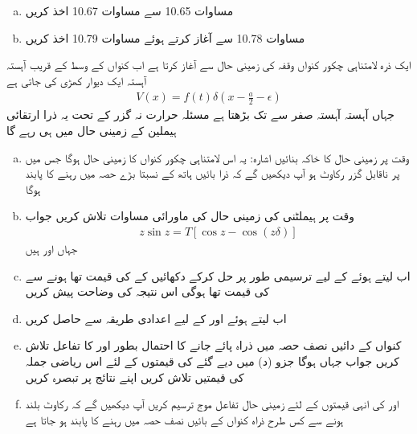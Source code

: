 \begin{enumerate}[a.]
\item
مساوات 10.65 سے مساوات 10.67 اخذ کریں 
\item
مساوات 10.78 سے آغاز کرتے ہوئے مساوات 10.79 اخذ کریں 
\end{enumerate}
ایک ذرہ لامتناہی چکور کنواں وقفہ  کی زمینی حال سے آغاز کرتا ہے اب کنواں کے وسط کے قریب آہستہ آہستہ ایک دیوار کھڑی کی جاتی ہے 
\begin{align*}
V (x) = f (t) \delta (x - \frac{a}{2} - \epsilon)
\end{align*}
جہاں  آہستہ آہستہ صفر سے  تک بڑھتا ہے مسئلہ حرارت نہ گزر کے تحت یہ ذرا ارتقائی ہیملین کے زمینی حال میں ہی رہے گا 
\begin{enumerate}[a.]
\item
وقت  پر زمینی حال کا خاکہ بنائیں اشارہ: یہ اس لامتناہی چکور کنواں کا زمینی حال ہوگا جس میں  پر ناقابل گزر رکاوٹ ہو آپ دیکھیں گے کہ ذرا بائیں ہاتھ کے نسبتا بڑے حصہ میں رہنے کا پابند ہوگا 
\item
وقت  پر ہیملٹنی کی زمینی حال کی ماورائی مساوات تلاش کریں جواب 
\begin{align*}
z \sin z = T [\cos z - \cos (z \delta)]
\end{align*}
جہاں    اور  ہیں 
\item
اب  لیتے ہوئے  کے لیے ترسیمی طور پر حل کرکے دکھائیں کے  کی قیمت  تھا  ہونے سے  کی قیمت  تھا  ہوگی اس نتیجہ کی وضاحت پیش کریں 
\item 
اب  لیتے ہوئے  اور  کے لیے  اعدادی طریقہ سے حاصل کریں 
\item
کنواں کے دائیں نصف حصہ میں ذراہ پائے جانے کا احتمال بطور  اور  کا تفاعل تلاش کریں جواب  جہاں  ہوگا جزو (د) میں دیے گئے  کی قیمتوں کے لئے اس ریاضی جملہ کی قیمتیں تلاش کریں اپنے نتائج پر تبصرہ کریں 
\item
{} اور  کی انہی قیمتوں کے لئے زمینی حال تفاعل موج ترسیم کریں آپ دیکھیں گے کہ رکاوٹ بلند ہونے سے کس طرح ذراہ کنواں کے بائیں نصف حصہ میں رہنے کا پابند ہو جاتا ہے 
\end{enumerate}
